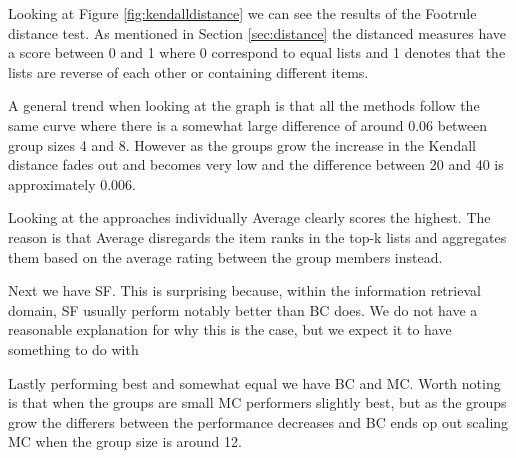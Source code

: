Looking at Figure \ref{fig:kendalldistance} we can see the results of the Footrule distance test. As mentioned in Section \ref{sec:distance}  the distanced measures have a score between 0 and 1 where 0 correspond to equal lists and 1 denotes that the lists are reverse of each other or containing different items. 

A general trend when looking at the graph is that all the methods follow the same curve where there is a somewhat large difference of around 0.06 between group sizes 4 and 8. However as the groups grow the increase in the Kendall distance fades out and becomes very low and the difference between 20 and 40 is approximately 0.006. 

Looking at the approaches individually Average clearly scores the highest. The reason is that Average disregards the item ranks in the top-k lists and aggregates them based on the average rating between the group members instead.  
   
Next we have SF. This is surprising because, within the information retrieval domain, SF usually perform notably better than BC does.  We do not have a reasonable explanation for why this is the case, but we expect it to have something to do with 

Lastly performing best and somewhat equal we have BC and MC. Worth noting is that when the groups are small MC performers slightly best, but as the groups grow the differers between the performance decreases and BC ends op out scaling MC when the group size is around 12.


